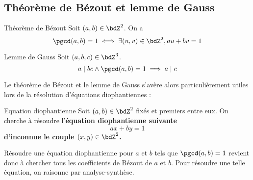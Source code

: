 \documentclass[a4paper,french,bookmarks]{article}
\begin{document}
\subsection{Théorème de Bézout et lemme de Gauss}

\begin{theorem}{Théorème de Bézout}{}
    Soit $(a, b) \in \bdZ^2$. On a
    \[ \pgcd(a, b) = 1 \iff \exists (u, v) \in \bdZ^2, au + bv = 1\]
\end{theorem}


\begin{lemma}{Lemme de Gauss}{}
    Soit $(a, b, c) \in \bdZ^3$.
    \[ a \mid bc \land \pgcd(a, b) = 1 \implies a \mid c\]
\end{lemma}

Le théorème de Bézout et le lemme de Gauss s'avère alors particulièrement utiles lors de la résolution d'équations diophantiennes :

\begin{form}{Equation diophantienne}{}
    Soit $(a, b) \in \bdZ^2$ fixés et premiers entre eux. On cherche à résoudre l'\bf{équation diophantienne} suivante
    \[ ax + by = 1\]
    d'inconnue le couple $(x, y) \in \bdZ^2$.
\end{form}

Résoudre une équation diophantienne pour $a$ et $b$ tels que $\pgcd(a, b) = 1$ revient donc à chercher tous les coefficients de Bézout de $a$ et $b$. Pour résoudre une telle équation, on raisonne par analyse-synthèse. 
\end{document}
